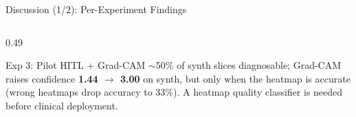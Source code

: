 \documentclass[aspectratio=169]{beamer}
\begin{document}
\begin{frame}{Discussion (1/2): Per-Experiment Findings}
\begin{columns}[T]
\begin{column}{0.49\textwidth}
\begin{minipage}[t][0.82\textheight][s]{\linewidth}
      \vfill
      {%
      \begin{block}{Exp 3: Pilot HITL + Grad-CAM}
        $\sim$50\% of synth slices diagnosable; Grad-CAM raises confidence
        \textbf{1.44 $\to$ 3.00} on synth, but only when the heatmap is accurate (wrong heatmaps drop accuracy to 33\%). A heatmap quality classifier is needed before clinical deployment.
      \end{block}}

      \vfill
      \phantom{X}
      \end{minipage}
    \end{column}
  \end{columns}
\end{frame}
\end{document}
